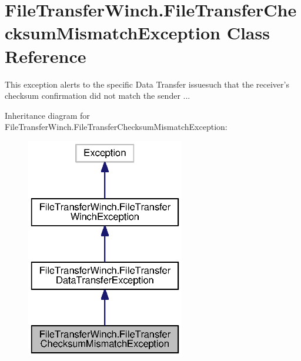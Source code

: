 \section{File\+Transfer\+Winch.\+File\+Transfer\+Checksum\+Mismatch\+Exception Class Reference}
\label{classorg_1_1smallfoot_1_1filexfer_1_1FileTransferWinch_1_1FileTransferChecksumMismatchException}


This exception alerts to the specific Data Transfer issuesuch that the receiver's checksum confirmation did not match the sender ...  




Inheritance diagram for File\+Transfer\+Winch.\+File\+Transfer\+Checksum\+Mismatch\+Exception\+:\nopagebreak
\begin{figure}[H]
\begin{center}
\leavevmode
\includegraphics[width=196pt]{classorg_1_1smallfoot_1_1filexfer_1_1FileTransferWinch_1_1FileTransferChecksumMismatchException__inherit__graph}
\end{center}
\end{figure}


